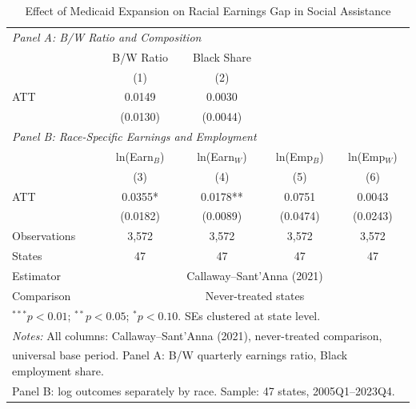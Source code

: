 \begin{table}[t]
\centering
\caption{Effect of Medicaid Expansion on Racial Earnings Gap in Social Assistance}
\label{tab:main}
\begin{tabular}{lcccc}
\hline\hline
\multicolumn{5}{l}{\textit{Panel A: B/W Ratio and Composition}} \\[3pt]
 & B/W Ratio & Black Share & & \\
 & (1) & (2) & & \\
\hline
ATT & 0.0149 & 0.0030 & & \\
 & (0.0130) & (0.0044) & & \\[6pt]
\hline
\multicolumn{5}{l}{\textit{Panel B: Race-Specific Earnings and Employment}} \\[3pt]
 & ln(Earn$_B$) & ln(Earn$_W$) & ln(Emp$_B$) & ln(Emp$_W$) \\
 & (3) & (4) & (5) & (6) \\
\hline
ATT & 0.0355* & 0.0178** & 0.0751 & 0.0043 \\
 & (0.0182) & (0.0089) & (0.0474) & (0.0243) \\
\hline
Observations & 3,572 & 3,572 & 3,572 & 3,572 \\
States & 47 & 47 & 47 & 47 \\
Estimator & \multicolumn{4}{c}{Callaway--Sant'Anna (2021)} \\
Comparison & \multicolumn{4}{c}{Never-treated states} \\
\hline
\multicolumn{5}{l}{\footnotesize $^{***}p<0.01$; $^{**}p<0.05$; $^{*}p<0.10$. SEs clustered at state level.}\\
\multicolumn{5}{l}{\footnotesize \textit{Notes:} All columns: Callaway--Sant'Anna (2021), never-treated comparison,}\\
\multicolumn{5}{l}{\footnotesize universal base period. Panel A: B/W quarterly earnings ratio, Black employment share.}\\
\multicolumn{5}{l}{\footnotesize Panel B: log outcomes separately by race. Sample: 47 states, 2005Q1--2023Q4.}\\
\hline\hline
\end{tabular}
\end{table}
